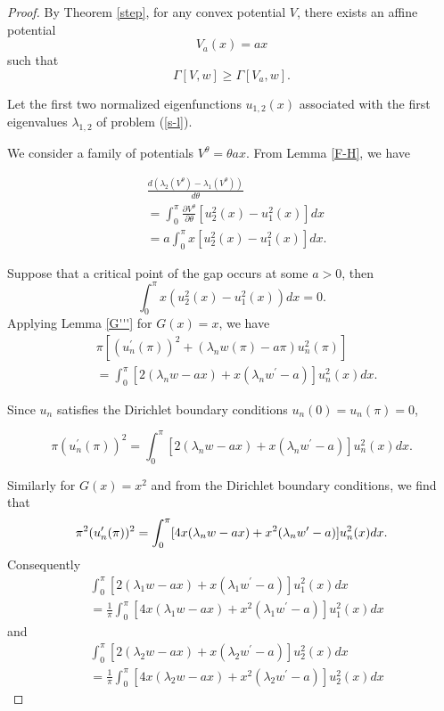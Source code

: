 \documentclass[12pt,a4paper]{amsart}
\begin{document}
\begin{proof}  
By Theorem \ref{step}, for any convex potential $V$, there exists an affine potential
\[
V_a(x) = ax 
\]
such that
\[
\Gamma[V,w] \geq \Gamma[V_a,w].
\]


\noindent Let the first two normalized eigenfunctions $u_{1,2}(x)$ associated with the first eigenvalues $\lambda_{1,2}$ of problem (\ref{s-l}). 

\noindent We consider a family of potentials $V^{\theta}=\theta ax$. 
 From Lemma \ref{F-H}, we have
 

\begin{align*}
&\frac{d(\lambda_2(V^{\theta})-\lambda_1(V^{\theta}))}{d\theta}\\
&=\int_0^{\pi} \frac{\partial V^{\theta}}{\partial \theta}[u_2^2(x)-u_1^2(x)]dx\\
 &=a\int_0^{\pi}x[u_2^2(x)-u_1^2(x)]dx.
\end{align*}
 

\noindent Suppose that a critical point of the gap occurs
at some $a>0$, then
$$
\int_0^{\pi}x(u_2^2(x)-u_1^2(x))dx =0.
$$
\noindent Applying Lemma \ref{G'''} for $G(x)=x$, we have
\begin{align*}
&\pi[(u_n^{\prime}(\pi))^{2}+(\lambda_n w(\pi)-a\pi )u_n^{2}(\pi)]\\
 &=\int_0^\pi [2(\lambda_n w-ax)+x(\lambda_n w^{\prime}-a)]u_n^2
(x)dx.
\end{align*}

\noindent Since $u_n$ satisfies the Dirichlet boundary conditions $u_n(0)=u_n(\pi)=0$, 

$$\pi(u_n^{\prime}(\pi))^{2}
 =\int_0^\pi [2(\lambda_n w-ax)+x(\lambda_n w^{\prime}-a)]u_n^2
(x)dx.
$$ 

\noindent Similarly for $G(x)=x^2$ and from the Dirichlet boundary conditions, we find that
$$\pi^2(u_n^{\prime}(\pi))^{2}\\
=\int_0^\pi [4x(\lambda_n w-ax)+x^2(\lambda_n w^{\prime}-a)]u_n^2(x)dx.$$
\noindent Consequently
\begin{align*}
&\int_0^\pi [2(\lambda_1 w-ax)+x(\lambda_1 w^{\prime}-a)]u_1^2
(x)dx\\
&=\frac{1}{\pi}\int_0^\pi [4x(\lambda_1 w-ax)+x^2(\lambda_1 w^{\prime}-a)]u_1^2(x)dx
\end{align*}
\noindent and
\begin{align*}
&\int_0^\pi [2(\lambda_2 w-ax)+x(\lambda_2 w^{\prime}-a)]u_2^2
(x)dx\\
&=\frac{1}{\pi}\int_0^\pi [4x(\lambda_2 w-ax)+x^2(\lambda_2 w^{\prime}-a)]u_2^2(x)dx
\end{align*}






\end{proof}
\end{document}
